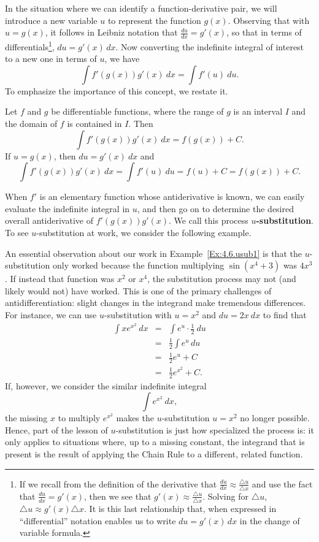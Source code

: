In the situation where we can identify a function-derivative pair, we will introduce a new variable $u$ to represent the function $g(x)$.  Observing that with $u = g(x)$, it follows in Leibniz notation that $\frac{du}{dx} = g'(x)$, so that in terms of differentials\footnote{If we recall from the definition of the derivative that $\frac{du}{dx} \approx \frac{\triangle{u}}{\triangle{x}}$ and use the fact that $\frac{du}{dx} = g'(x)$, then we see that $g'(x) \approx \frac{\triangle{u}}{\triangle{x}}$.  Solving for $\triangle u$, $\triangle u \approx g'(x) \triangle x$.  It is this last relationship that, when expressed in ``differential'' notation enables us to write $du = g'(x) \, dx$ in the change of variable formula.}, $du = g'(x)\, dx$.  Now converting the indefinite integral of interest to a new one in terms of $u$, we have  
\[ \int f'(g(x)) g'(x) \ dx = \int f'(u) \ du. \]
To emphasize the importance of this concept, we restate it.
 
{Let $f$ and $g$ be differentiable functions, where the range of $g$ is an interval $I$ and the domain of $f$ is contained in $I$. Then 
\[ \int f'(g(x))g'(x)\ dx = f(g(x)) + C. \]
If $u = g(x)$, then $du = g'(x) \ dx$ and 
\[ \int f'(g(x))g'(x)\ dx = \int f'(u)\ du = f(u)+C = f(g(x))+C. \]
} %

When $f'$ is an elementary function whose antiderivative is known, we can easily evaluate the indefinite integral in $u$, and then go on to determine the desired overall antiderivative of $f'(g(x)) g'(x)$.  We call this process \textbf{$u$-substitution}.  To see $u$-substitution at work, we consider the following example.


An essential observation about our work in Example~\ref{Ex:4.6.usub1} is that the $u$-substitution only worked because the function multiplying $\sin (x^4 + 3)$ was $4x^3$.  If instead that function was $x^2$ or $x^4$, the substitution process may not (and likely would not) have worked.  This is one of the primary challenges of antidifferentiation: slight changes in the integrand make tremendous differences.  For instance, we can use $u$-substitution with $u = x^2$ and $du = 2x \ dx$ to find that
\begin{eqnarray*}
\int xe^{x^2} \ dx & = & \int e^u \cdot \frac{1}{2} \ du \\
& = & \frac{1}{2} \int e^u \, du \\
& = & \frac{1}{2} e^u + C \\
& = & \frac{1}{2} e^{x^2} + C.
\end{eqnarray*}
If, however, we consider the similar indefinite integral
\[ \int e^{x^2} \ dx, \]
the missing $x$ to multiply $e^{x^2}$ makes the $u$-substitution $u = x^2$ no longer possible.  Hence, part of the lesson of $u$-substitution is just how specialized the process is: it only applies to situations where, up to a missing constant, the integrand that is present is the result of applying the Chain Rule to a different, related function.

